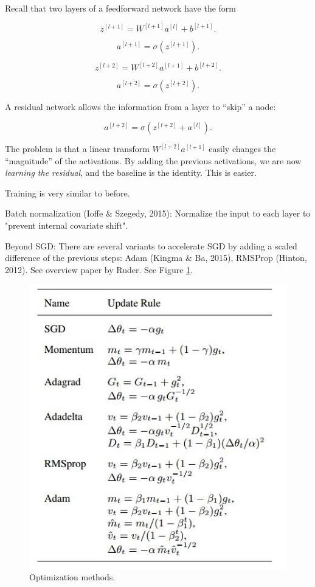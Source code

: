 \documentclass[english]{article}
\begin{document}
Recall that two layers of a feedforward network have the form

$$z^{[l+1]} = W^{[l+1]}a^{[l]}+b^{[l+1]}.$$

$$a^{[l+1]} = \sigma(z^{[l+1]}).$$

$$z^{[l+2]} = W^{[l+2]}a^{[l+1]}+b^{[l+2]}.$$

$$a^{[l+2]} = \sigma(z^{[l+2]}).$$

A residual network allows the information from a layer to ``skip'' a node: 

$$a^{[l+2]} = \sigma(z^{[l+2]}+ a^{[l]}).$$
 
The problem is that a linear transform $W^{[l+2]}a^{[l+1]}$ easily changes the ``magnitude'' of the activations. By adding the previous activations, we are now \emph{learning the residual}, and the baseline is the identity. This is easier. 

Training is very similar to before. 

\item Batch normalization (Ioffe \& Szegedy, 2015): Normalize the input to each layer to "prevent internal covariate shift".

\item Beyond SGD: There are several variants to accelerate SGD by adding a scaled difference of the previous steps: Adam (Kingma \& Ba, 2015), RMSProp (Hinton, 2012). See overview paper by Ruder. See Figure \ref{opt}.

\begin{figure}
  \centering
  \includegraphics[scale=0.5]{opt}
  \caption{Optimization methods.}
  \label{opt}
\end{figure}
\end{document}
